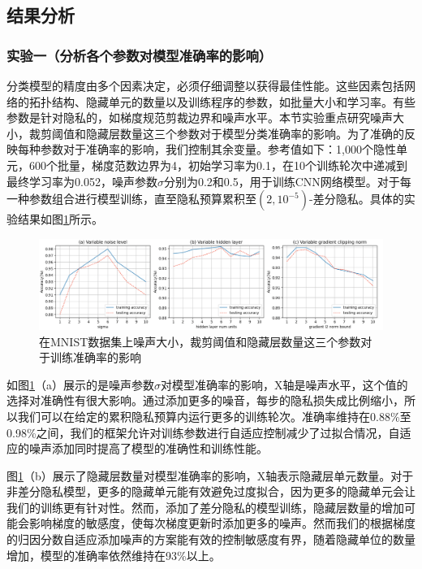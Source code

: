 \subsection{结果分析}

\subsubsection{实验一（分析各个参数对模型准确率的影响）} 
分类模型的精度由多个因素决定，必须仔细调整以获得最佳性能。这些因素包括网络的拓扑结构、隐藏单元的数量以及训练程序的参数，如批量大小和学习率。有些参数是针对隐私的，如梯度规范剪裁边界和噪声水平。本节实验重点研究噪声大小，裁剪阈值和隐藏层数量这三个参数对于模型分类准确率的影响。为了准确的反映每种参数对于准确率的影响，我们控制其余变量。参考值如下：1,000个隐性单元，600个批量，梯度范数边界为4，初始学习率为0.1，在10个训练轮次中递减到最终学习率为0.052，噪声参数$\sigma$分别为0.2和0.5，用于训练CNN网络模型。对于每一种参数组合进行模型训练，直至隐私预算累积至$\left(2,10^{-5}\right)$-差分隐私。具体的实验结果如图\ref{fig:在MNIST数据集上噪声大小，裁剪阈值和隐藏层数量这三个参数对于训练准确率的影响}所示。

\begin{figure}[!hbt]
\centering
	\includegraphics[scale=0.32]{fig2/C3/第三章实验一}%
	\caption{在MNIST数据集上噪声大小，裁剪阈值和隐藏层数量这三个参数对于训练准确率的影响}
	\label{fig:在MNIST数据集上噪声大小，裁剪阈值和隐藏层数量这三个参数对于训练准确率的影响}	
\end{figure}

如图\ref{fig:在MNIST数据集上噪声大小，裁剪阈值和隐藏层数量这三个参数对于训练准确率的影响}（a）展示的是噪声参数$\sigma$对模型准确率的影响，X轴是噪声水平，这个值的选择对准确性有很大影响。通过添加更多的噪音，每步的隐私损失成比例缩小，所以我们可以在给定的累积隐私预算内运行更多的训练轮次。准确率维持在0.88\%至0.98\%之间，我们的框架允许对训练参数进行自适应控制减少了过拟合情况，自适应的噪声添加同时提高了模型的准确性和训练性能。

图\ref{fig:在MNIST数据集上噪声大小，裁剪阈值和隐藏层数量这三个参数对于训练准确率的影响}（b）展示了隐藏层数量对模型准确率的影响，X轴表示隐藏层单元数量。对于非差分隐私模型，更多的隐藏单元能有效避免过度拟合，因为更多的隐藏单元会让我们的训练更有针对性。然而，添加了差分隐私的模型训练，隐藏层数量的增加可能会影响梯度的敏感度，使每次梯度更新时添加更多的噪声。然而我们的根据梯度的归因分数自适应添加噪声的方案能有效的控制敏感度有界，随着隐藏单位的数量增加，模型的准确率依然维持在93\%以上。


